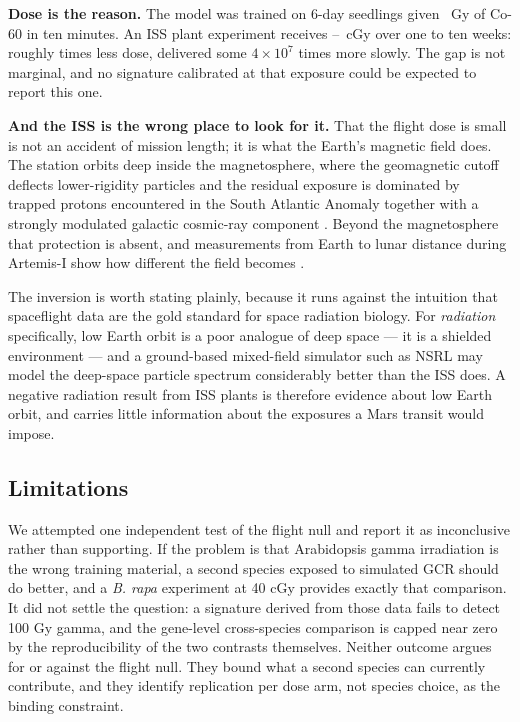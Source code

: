\textbf{Dose is the reason.} The model was trained on 6-day seedlings given
\TrainingDoseGy{}~Gy of Co-60 in ten minutes. An ISS plant experiment receives
\IssDoseLo{}--\IssDoseHi{}~cGy over one to ten weeks: roughly \TrainingToIssFold{} times
less dose, delivered some $4 \times 10^{7}$ times more slowly. The gap is not marginal, and
no signature calibrated at that exposure could be expected to report this one.

\textbf{And the ISS is the wrong place to look for it.} That the flight dose is small is
not an accident of mission length; it is what the Earth's magnetic field does. The station
orbits deep inside the magnetosphere, where the geomagnetic cutoff deflects lower-rigidity
particles and the residual exposure is dominated by trapped protons encountered in the
South Atlantic Anomaly together with a strongly modulated galactic cosmic-ray component
\citep{reitz2008leo}. Beyond the magnetosphere that protection is absent, and measurements
from Earth to lunar distance during Artemis-I show how different the field becomes
\citep{slaba2025artemis}.

The inversion is worth stating plainly, because it runs against the intuition that
spaceflight data are the gold standard for space radiation biology. For \emph{radiation}
specifically, low Earth orbit is a poor analogue of deep space --- it is a shielded
environment --- and a ground-based mixed-field simulator such as NSRL may model the
deep-space particle spectrum considerably better than the ISS does. A negative radiation
result from ISS plants is therefore evidence about low Earth orbit, and carries little
information about the exposures a Mars transit would impose.

\subsection*{Limitations}

We attempted one independent test of the flight null and report it as inconclusive rather
than supporting. If the problem is that Arabidopsis gamma irradiation is the wrong training
material, a second species exposed to simulated GCR should do better, and a
\textit{B. rapa} experiment at 40 cGy provides exactly that comparison. It did not settle
the question: a signature derived from those data fails to detect 100 Gy gamma, and the
gene-level cross-species comparison is capped near zero by the reproducibility of the two
contrasts themselves. Neither outcome argues for or against the flight null. They bound
what a second species can currently contribute, and they identify replication per dose arm,
not species choice, as the binding constraint.

